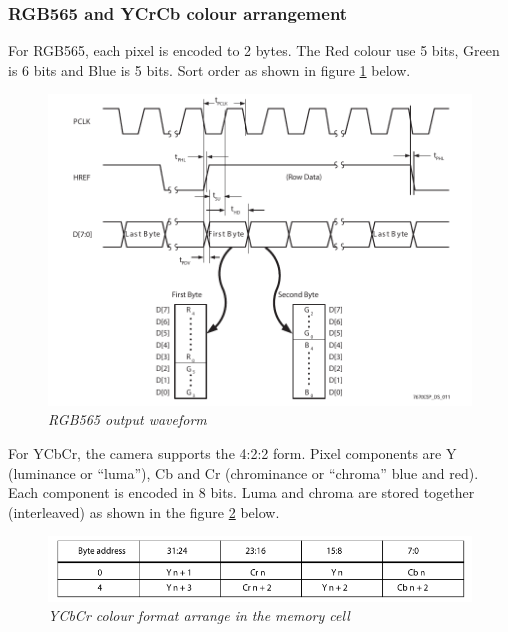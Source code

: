 \documentclass[D:/Latex/Internship/Report/Latex/Report.tex]{subfiles}
\begin{document}
				\subsubsection{RGB565 and YCrCb colour arrangement}
				\label{subsubsec:RGB565}
					For RGB565, each pixel is encoded to 2 bytes. The Red colour use 5 bits, Green is 6 bits and Blue is 5 bits. Sort order as shown in figure \ref{fig:RGB565 ouput waveform} below.	\\
					\begin{figure}[ht!]
						\centering
						\includegraphics[scale = 0.85]{Figure/Ov_RGB565.pdf}
						\caption{\it RGB565 output waveform}
						\label{fig:RGB565 ouput waveform}
					\end{figure}
					\newline
					For YCbCr, the camera supports the 4:2:2 form. Pixel components are Y (luminance or “luma”), Cb and Cr (chrominance or “chroma” blue and red). Each component is encoded in 8 bits. Luma and chroma are stored together (interleaved) as shown in the figure \ref{fig:YCbCr Colour format in memory} below.	\\
					\begin{figure}[ht!]
						\centering
						\includegraphics[scale = 1]{Figure/Ov_YCbCr.pdf}
						\caption{\it YCbCr colour format arrange in the memory cell}
						\label{fig:YCbCr Colour format in memory}
					\end{figure}
\end{document}
